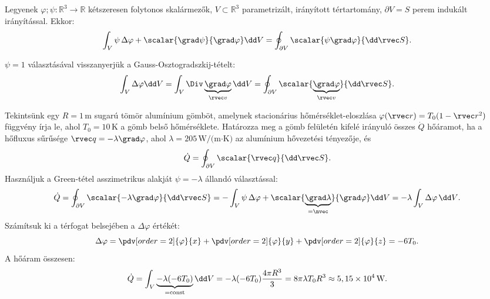 \documentclass[a4paper, 12pt]{scrartcl}
\newcommand\coordv{\rvec r}
\begin{document}
\begin{theorem}
  Legyenek $\varphi; \psi: \mathbb R^3 \rightarrow \mathbb R$ kétszeresen
  folytonos skalármezők, $V \subset \mathbb R^3$ parametrizált, irányított
  tértartomány, $\partial V = S$ perem indukált irányítással. Ekkor:
  \[
    \int_V
    \psi \, \Delta \varphi +
    \scalar{\grad \psi}{\grad \varphi}
    \dd V
    =
    \oint_{\partial V} \scalar{\psi \grad \varphi}{\dd \rvec S}
    \text.
  \]
\end{theorem}

\begin{note}
  $\psi = 1$ választásával visszanyerjük a Gauss-Osztogradszkij-tételt:
  $$
    \int_V \Delta \varphi \dd V
    = \int_V \Div \underbrace{\grad \varphi}_{\rvec v} \dd V
    = \oint_{\partial V} \scalar{\underbrace{\grad \varphi}_{\rvec v}}{\dd \rvec S}
    \text.
  $$
\end{note}

\begin{example}
  Tekintsünk egy $R = 1\,\text{m}$ sugarú tömör alumínium gömböt, amelynek
  stacionárius hőmérséklet-eloszlása $\varphi(\coordv) = T_0 (1 - \rvec r^2)$
  függvény írja le, ahol $T_0 = 10\,\text{K}$ a gömb belső hőmérséklete.
  Határozza meg a gömb felületén kifelé irányuló összes  $\dot Q$ hőáramot,
  ha a hőfluxus sűrűsége $\rvec q = -\lambda \grad \varphi$, ahol
  $\lambda = 205\,\text{W/(m·K)}$ az alumínium hővezetési tényezője, és
  $$
    \dot Q = \oint_{\partial V} \scalar{\rvec q}{\dd \rvec S}
    \text.
  $$
  Használjuk a Green-tétel asszimetrikus alakját $\psi = -\lambda$ állandó
  választással:
  $$
    \dot Q
    = \oint_{\partial V} \scalar{-\lambda \grad \varphi}{\dd \rvec S}
    = - \int_V \psi \, \Delta \varphi + \scalar{\underbrace{\grad \lambda}_{= \nvec}}{\grad \varphi} \dd V
    = -\lambda \int_V \Delta \varphi \, \dd V
    \text.
  $$
  Számítsuk ki a térfogat belsejében a $\Delta \varphi$ értékét:
  $$
    \Delta \varphi
    =\pdv[order=2]{\varphi}{x} + \pdv[order=2]{\varphi}{y} + \pdv[order=2]{\varphi}{z}
    = -6 T_0
    \text.
  $$
  A hőáram összesen:
  $$
    \dot Q = \int_V \underbrace{-\lambda (-6 T_0)}_{=\text{const}} \dd V
    = -\lambda (-6 T_0) \frac{4\pi R^3}{3}
    = 8 \pi \lambda T_0 R^3
    \approx 5,15 \times 10^{4}\,\text{W}
    \text.
  $$
\end{example}
\end{document}
